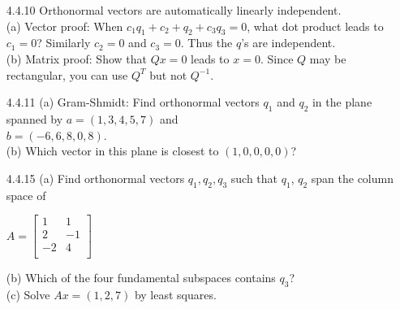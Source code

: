 \documentclass[10pt,twoside,reqno]{article}
\begin{document}
\begin{enumerate}
\vspace{3mm}
\item[4.4.10] Orthonormal vectors are automatically linearly independent.\\
(a) Vector proof: When $c_1q_1 + c_2+q_2 + c_3q_3 = 0$, what dot product leads to $c_1 = 0$? Similarly $c_2 = 0$ and $c_3 = 0$. Thus the $q$'s are independent.\\
(b) Matrix proof: Show that $Qx = 0$ leads to $x = 0$. Since $Q$ may be rectangular, you can use $Q^T$ but not $Q^{-1}$.\\
\vspace{3mm}

\vspace{3mm}
\item[4.4.11] (a) Gram-Shmidt: Find orthonormal vectors $q_1$ and $q_2$ in the plane spanned by $a = (1, 3, 4, 5, 7)$ and\\
\hspace{6mm}$b = (-6, 6, 8, 0, 8)$.\\
(b) Which vector in this plane is closest to $(1, 0, 0, 0, 0)$?\\
\vspace{3mm}

\vspace{3mm}
\item[4.4.15] (a) Find orthonormal vectors $q_1, q_2, q_3$ such that $q_1$, $q_2$ span the column space of\\
\begin{center}
$
$$
A =
\begin{bmatrix}
1&1\\
2&-1\\
-2&4\\
\end{bmatrix}
$$
$\\
\end{center}
(b) Which of the four fundamental subspaces contains $q_3$?\\
(c) Solve $Ax = (1, 2, 7)$ by least squares.\\
\vspace{3mm}


\end{enumerate}
\end{document}

